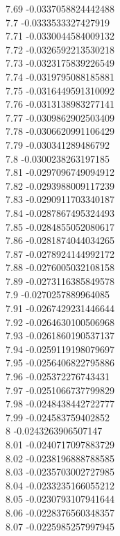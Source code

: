 {7.69	-0.0337058824442488\\
7.7	-0.0333533327427919\\
7.71	-0.0330044584009132\\
7.72	-0.0326592213530218\\
7.73	-0.0323175839226549\\
7.74	-0.0319795088185881\\
7.75	-0.0316449591310092\\
7.76	-0.0313138983277141\\
7.77	-0.0309862902503409\\
7.78	-0.0306620991106429\\
7.79	-0.030341289486792\\
7.8	-0.0300238263197185\\
7.81	-0.0297096749094912\\
7.82	-0.0293988009117239\\
7.83	-0.0290911703340187\\
7.84	-0.0287867495324493\\
7.85	-0.0284855052080617\\
7.86	-0.0281874044034265\\
7.87	-0.0278924144992172\\
7.88	-0.0276005032108158\\
7.89	-0.0273116385849578\\
7.9	-0.0270257889964085\\
7.91	-0.0267429231446644\\
7.92	-0.0264630100506968\\
7.93	-0.0261860190537137\\
7.94	-0.0259119198079697\\
7.95	-0.0256406822795886\\
7.96	-0.025372276743431\\
7.97	-0.0251066737799829\\
7.98	-0.0248438442722777\\
7.99	-0.024583759402852\\
8	-0.0243263906507147\\
8.01	-0.0240717097883729\\
8.02	-0.0238196888788585\\
8.03	-0.0235703002727985\\
8.04	-0.0233235166055212\\
8.05	-0.0230793107941644\\
8.06	-0.0228376560348357\\
8.07	-0.0225985257997945\\
}
